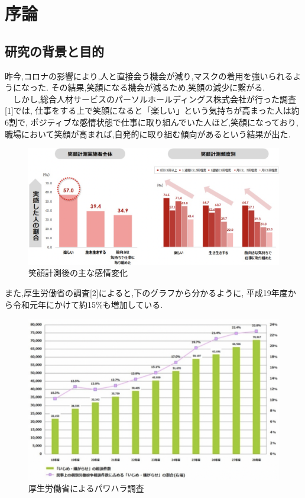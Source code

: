 \chapter{序論}
\label {chp:tex_basic}

\section{研究の背景と目的}
\label{sec:tex_basic_section}
昨今,コロナの影響により,人と直接会う機会が減り,マスクの着用を強いられるようになった.
その結果,笑顔になる機会が減るため,笑顔の減少に繋がる. \\
　しかし,総合人材サービスのパーソルホールディングス株式会社が行った調査[1]では,
仕事をする上で笑顔になると「楽しい」という気持ちが高まった人は約6割で,
ポジティブな感情状態で仕事に取り組んでいた人ほど,笑顔になっており,
職場において笑顔が高まれば,自発的に取り組む傾向があるという結果が出た.

\begin{figure}[!h]
    \begin{center}
        \includegraphics[scale=0.5, clip]{./img/work.png}
        \caption{笑顔計測後の主な感情変化}
        \label{fig:図の名前}
    \end{center}
\end{figure}

また,厚生労働省の調査[2]によると,下のグラフから分かるように,
平成19年度から令和元年にかけて約15\%も増加している.

\clearpage

\begin{figure}[!h]
    \begin{center}
        \includegraphics[scale=0.6, clip]{./img/graph.png}
        \caption{厚生労働省によるパワハラ調査}
        \label{fig:図の名前}
    \end{center}
\end{figure}


